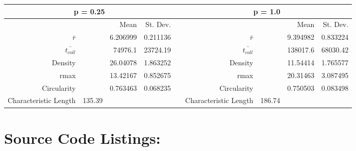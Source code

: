 \documentclass{article}
\begin{document}
\begin{appendix}
\begin{table}
\begin{tabular}{rrrrrrrrr}
    \midrule
		\multicolumn{4}{c}{p = 0.25}  & \multicolumn{1}{c}{} & \multicolumn{4}{c}{p = 1.0} \\
    \midrule
					&       & Mean  & St. Dev. &       &       &       & Mean  & St. Dev. \\
    $\bar{r}$   &       & 6.206999 & 0.211136 &       & $\bar{r}$   &       & 9.394982 & 0.833224 \\
    $\bar{t_{coll}}$   &       & 74976.1 & 23724.19 &       & $\bar{t_{coll}}$   &       & 138017.6 & 68030.42 \\
    Density &       & 26.04078 & 1.863252 &       & Density &       & 11.54414 & 1.765577 \\
    rmax  &       & 13.42167 & 0.852675 &       & rmax  &       & 20.31463 & 3.087495 \\
    Circularity &       & 0.763463 & 0.068235 &       & Circularity &       & 0.750503 & 0.083498 \\
    Characteristic Length & 135.39 &       &       &       & Characteristic Length & 186.74 &       &  \\
    \bottomrule
    \end{tabular}%
  \label{tab:dat}%
\end{table}%



\section{Source Code Listings: \label{source}}
	
	

	

	

	

	
\end{appendix} 


\end{document}
